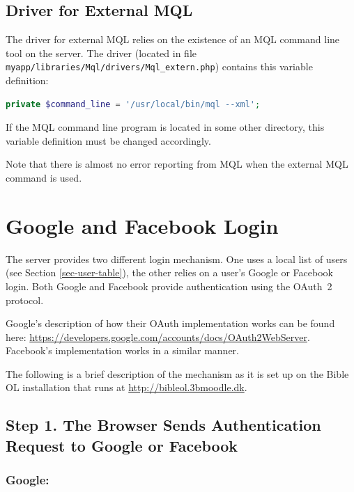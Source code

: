 \documentclass[11pt,oneside,a4paper]{memoir}
\begin{document}
\subsection{Driver for External MQL}\label{sec-mql-extern}

The driver for external MQL relies on the existence of an MQL command line tool on the server. The
driver (located in file \texttt{myapp/libraries/Mql/drivers/Mql\_extern.php}) contains this variable
definition:

\begin{lstlisting}[language=PHP]
private $command_line = '/usr/local/bin/mql --xml';
\end{lstlisting}

If the MQL command line program is located in some other directory, this variable definition must be
changed accordingly.

Note that there is almost no error reporting from MQL when the external MQL command is used.


\section{Google and Facebook Login}\label{sec-oauth-login}

The server provides two different login mechanism. One uses a local list of users
(see Section \ref{sec-user-table}), the other relies on a user's Google or Facebook login. Both
Google and Facebook provide authentication using the OAuth~2 protocol.

Google's description of how their OAuth implementation works can be found here:
\url{https://developers.google.com/accounts/docs/OAuth2WebServer}. Facebook's implementation works
in a similar manner.

The following is a brief description of the mechanism as it is set up on the Bible OL installation
that runs at \url{http://bibleol.3bmoodle.dk}.

\subsection*{Step 1. The Browser Sends Authentication Request to Google or Facebook}

\subsubsection*{Google:}
\end{document}
